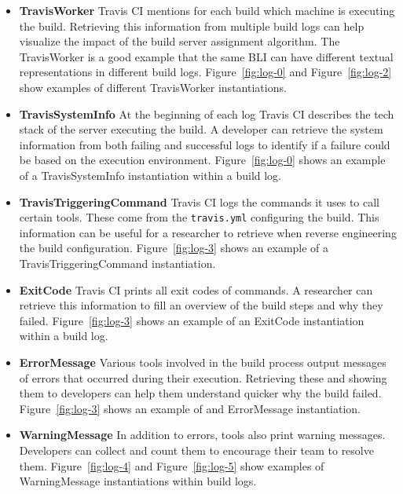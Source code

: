\documentclass[\myrootdir/main.tex]{subfiles}
\begin{document}
\begin{itemize}
	\item \textbf{TravisWorker} Travis CI mentions for each build which machine is executing the build.
	      Retrieving this information from multiple build logs can help visualize the impact of the build server assignment algorithm.
	      The TravisWorker is a good example that the same BLI can have different textual representations in different build logs.
	      Figure~\ref{fig:log-0} and Figure~\ref{fig:log-2} show examples of different TravisWorker instantiations.

	\item \textbf{TravisSystemInfo} At the beginning of each log Travis CI describes the tech stack of the server executing the build.
				A developer can retrieve the system information from both failing and successful logs to identify if a failure could be based on the execution environment.
	      Figure~\ref{fig:log-0} shows an example of a TravisSystemInfo instantiation within a build log.

	\item \textbf{TravisTriggeringCommand} Travis CI logs the commands it uses to call certain tools.
	      These come from the \texttt{travis.yml} configuring the build.
				This information can be useful for a researcher to retrieve when reverse engineering the build configuration.
	      Figure~\ref{fig:log-3} shows an example of a TravisTriggeringCommand instantiation.

	\item \textbf{ExitCode} Travis CI prints all exit codes of commands.
				A researcher can retrieve this information to fill an overview of the build steps and why they failed.
	      Figure~\ref{fig:log-3} shows an example of an ExitCode instantiation within a build log.

	\item \textbf{ErrorMessage} Various tools involved in the build process output messages of errors that occurred during their execution.
	      Retrieving these and showing them to developers can help them understand quicker why the build failed.
	      Figure~\ref{fig:log-3} shows an example of and ErrorMessage instantiation.

	\item \textbf{WarningMessage} In addition to errors, tools also print warning messages.
				Developers can collect and count them to encourage their team to resolve them.
	      Figure~\ref{fig:log-4} and Figure~\ref{fig:log-5} show examples of WarningMessage instantiations within build logs.

\end{itemize}
\end{document}
